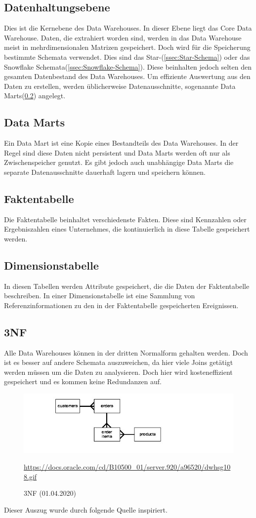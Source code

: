 \subsection{Datenhaltungsebene}
Dies ist die Kernebene des Data Warehouses. In dieser Ebene liegt das Core Data Warehouse. Daten, die extrahiert worden sind, werden in das Data Warehouse meist in mehrdimensionalen Matrizen gespeichert. Doch wird für die Speicherung bestimmte Schemata verwendet. Dies sind das Star-(\ref{ssec:Star-Schema}) oder das Snowflake Schemata(\ref{ssec:Snowflake-Schema}). Diese beinhalten jedoch selten den gesamten Datenbestand des Data Warehouses. Um effiziente Auswertung aus den Daten zu erstellen, werden üblicherweise Datenausschnitte, sogenannte Data Marts(\ref{ssec:Data-Marts}) angelegt.
\subsection{Data Marts}\label{ssec:Data-Marts}
Ein Data Mart ist eine Kopie eines Bestandteils des Data Warehouses. In der Regel sind diese Daten nicht persistent und Data Marts werden oft nur als Zwischenspeicher genutzt. Es gibt jedoch auch unabhängige Data Marts die separate Datenausschnitte dauerhaft lagern und speichern können.
\subsection{Faktentabelle}\label{ssec:Fakten-Tabelle}
Die Faktentabelle beinhaltet verschiedenste Fakten. Diese sind Kennzahlen oder Ergebniszahlen eines Unternehmes, die kontinuierlich in diese Tabelle gespeichert werden.
\subsection{Dimensionstabelle}\label{ssec:Dimensions-Tabelle}
In diesen Tabellen werden Attribute gespeichert, die die Daten der Faktentabelle beschreiben. In einer Dimensionstabelle ist eine Sammlung von Referenzinformationen zu den in der Faktentabelle gespeicherten Ereignissen.
\subsection{3NF}\label{ssec:Dritte-NF}
Alle Data Warehouses können in der dritten Normalform gehalten werden. Doch ist es besser auf andere Schemata auszuweichen, da hier viele Joins getätigt werden müssen um die Daten zu analysieren. Doch hier wird kosteneffizient gespeichert und es kommen keine Redundanzen auf.
\begin{figure}[H]
\centering
  \includegraphics[scale=0.5]{images/3NF.png}
  \caption[3NF (01.04.2020)]{3NF (01.04.2020)}
  \url{https://docs.oracle.com/cd/B10500_01/server.920/a96520/dwhsg108.gif}
  \label{fig:3NF}
\end{figure}
Dieser Auszug wurde durch folgende Quelle inspiriert. \cite{oracle_schema_2020}

